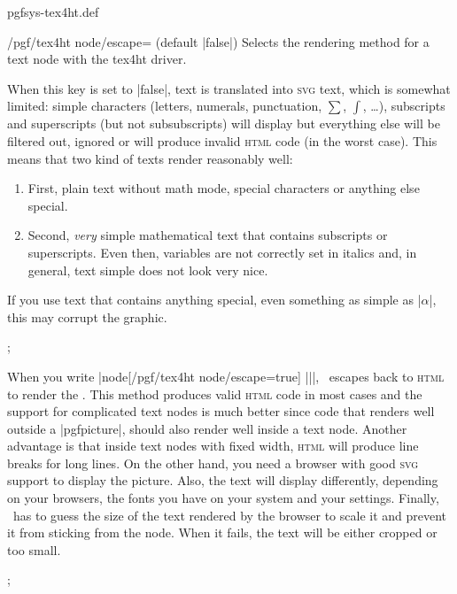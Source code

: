 \begin{filedescription}{pgfsys-tex4ht.def}
  \begin{key}{/pgf/tex4ht node/escape= (default |false|)}
    Selects the rendering method for a text node with the tex4ht driver.

    When this key is set to |false|, text is translated into
    \textsc{svg} text, which is somewhat limited: simple
    characters (letters, numerals, punctuation, $\sum$, $\int$, \ldots),
    subscripts and superscripts (but not subsubscripts) will display but
    everything else will be filtered out, ignored or will produce
    invalid \textsc{html} code (in the worst case). This means that two
    kind of texts render reasonably well:
    \begin{enumerate}
    \item First, plain text without math mode, special characters or
      anything else special.
    \item Second, \emph{very} simple mathematical text that contains
      subscripts or superscripts. Even then, variables are not correctly
      set in italics and, in general, text simple does not look very
      nice.
    \end{enumerate}
    If you use text that contains anything special, even something as
    simple as |$\alpha$|, this may corrupt the graphic.

\begin{codeexample}
\tikz {};
\end{codeexample}

    When you write |node[/pgf/tex4ht node/escape=true] {||}|,
    \pgfname\ escapes back to \textsc{html} to render the
    . This method produces valid \textsc{html} code in most
    cases and the support for complicated text nodes is much better since
    code that renders well outside a |{pgfpicture}|, should also
    render well inside a text node. Another advantage is that inside
    text nodes with fixed width, \textsc{html} will produce line
    breaks for long  lines. On the other hand, you need a browser with
    good \textsc{svg} support to display the picture. Also, the text
    will display differently, depending on your browsers, the fonts
    you have on your system and your settings. Finally,
    \pgfname\ has to guess the size of the text rendered by the
    browser to scale it and prevent it from sticking from the
    node. When it fails, the text will be either cropped or too small.
\begin{codeexample}
\tikz {};
\end{codeexample}
  \end{key}


\end{filedescription}
